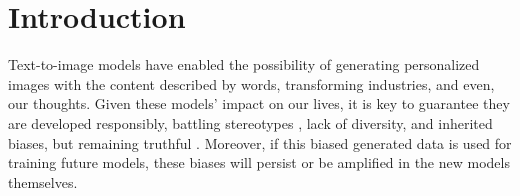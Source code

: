 \section{Introduction}
\label{sec:intro}
Text-to-image models have enabled the possibility of generating personalized images with the content described by words, transforming industries, and even, our thoughts. Given these models’ impact on our lives, it is key to guarantee they are developed responsibly, battling stereotypes \cite{bloomberg, SolbesCanales2020SocializationOG}, lack of diversity, and inherited biases, but remaining truthful \cite{verge2024gemini}. Moreover, if this biased generated data is used for training future models, these biases will persist or be amplified in the new models themselves. 







